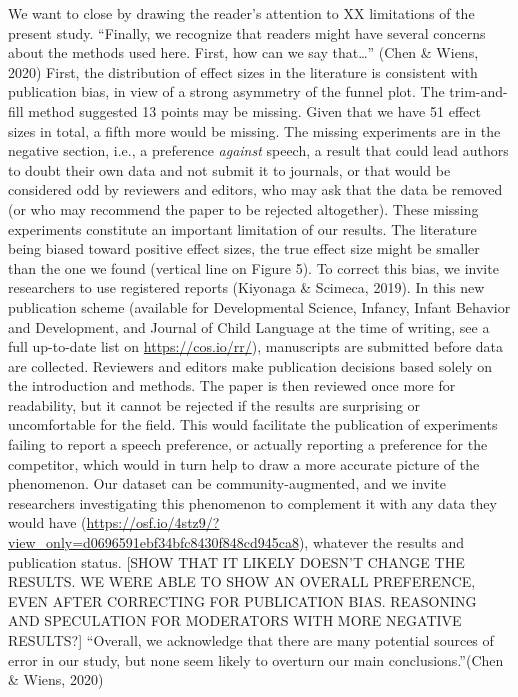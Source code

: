 \documentclass[man]{apa6}
\begin{document}
We want to close by drawing the reader's attention to XX limitations of
the present study. \enquote{Finally, we recognize that readers might
have several concerns about the methods used here. First, how can we say
that\ldots{}} (Chen \& Wiens, 2020) First, the distribution of effect
sizes in the literature is consistent with publication bias, in view of
a strong asymmetry of the funnel plot. The trim-and-fill method
suggested 13 points may be missing. Given that we have 51 effect sizes
in total, a fifth more would be missing. The missing experiments are in
the negative section, i.e., a preference \emph{against} speech, a result
that could lead authors to doubt their own data and not submit it to
journals, or that would be considered odd by reviewers and editors, who
may ask that the data be removed (or who may recommend the paper to be
rejected altogether). These missing experiments constitute an important
limitation of our results. The literature being biased toward positive
effect sizes, the true effect size might be smaller than the one we
found (vertical line on Figure 5). To correct this bias, we invite
researchers to use registered reports (Kiyonaga \& Scimeca, 2019). In
this new publication scheme (available for Developmental Science,
Infancy, Infant Behavior and Development, and Journal of Child Language
at the time of writing, see a full up-to-date list on
\url{https://cos.io/rr/}), manuscripts are submitted before data are
collected. Reviewers and editors make publication decisions based solely
on the introduction and methods. The paper is then reviewed once more
for readability, but it cannot be rejected if the results are surprising
or uncomfortable for the field. This would facilitate the publication of
experiments failing to report a speech preference, or actually reporting
a preference for the competitor, which would in turn help to draw a more
accurate picture of the phenomenon. Our dataset can be
community-augmented, and we invite researchers investigating this
phenomenon to complement it with any data they would have
(\url{https://osf.io/4stz9/?view_only=d0696591ebf34bfc8430f848cd945ca8}),
whatever the results and publication status. {[}SHOW THAT IT LIKELY
DOESN'T CHANGE THE RESULTS. WE WERE ABLE TO SHOW AN OVERALL PREFERENCE,
EVEN AFTER CORRECTING FOR PUBLICATION BIAS. REASONING AND SPECULATION
FOR MODERATORS WITH MORE NEGATIVE RESULTS?{]} \enquote{Overall, we
acknowledge that there are many potential sources of error in our study,
but none seem likely to overturn our main conclusions.}(Chen \& Wiens,
2020)
\end{document}
